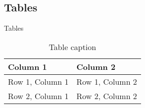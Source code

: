 \subsection{Tables}
\begin{frame}{Tables}
    \begin{table}
        \caption{Table caption}
        \begin{tabular}{ll}
            \hline
            Column 1 & Column 2\\
            \hline
            Row 1, Column 1 & Row 1, Column 2\\
            Row 2, Column 1 & Row 2, Column 2\\            
            \hline
        \end{tabular}
    \end{table}
\end{frame}